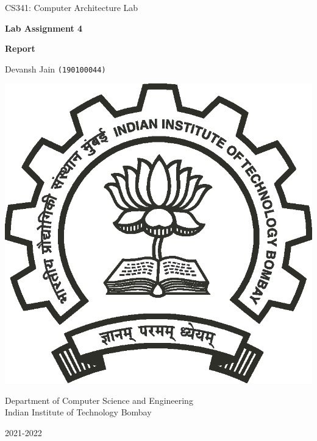 \documentclass[11pt, swedish, openany]{book}
\begin{document}

\begin{titlepage}
    \clearpage\thispagestyle{empty}
    \centering
    \vspace{2cm}

    {\large CS341: Computer Architecture Lab \par}
    \vspace{4cm}
    {\Huge \textbf{Lab Assignment 4} \par}
    \vspace{0.2cm}
    {\huge \textbf{Report} \par}
    \vspace{1.2cm}
    {\normalsize Devansh Jain \texttt{(190100044)} \par}
    \vfill
    {\includegraphics[scale=0.30]{iitb_logo/iitb_logo.eps} \par}
    \vspace{0.5cm}
    {\normalsize
        Department of Computer Science and Engineering \\
        Indian Institute of Technology Bombay \par}
    {\normalsize 2021-2022 \par}

\end{titlepage}
\end{document}
